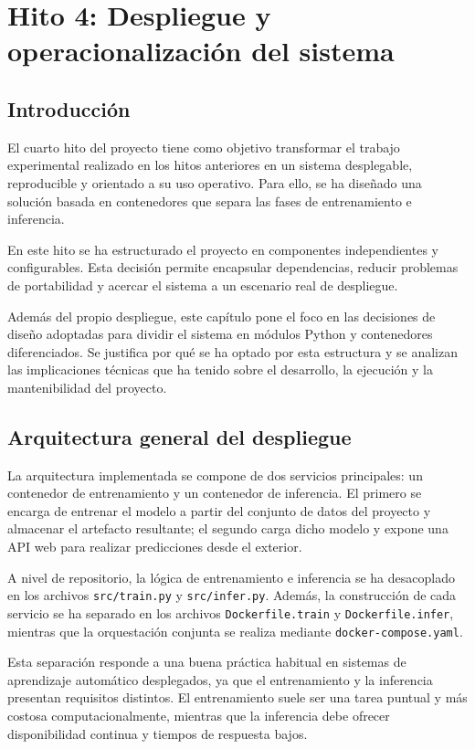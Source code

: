 \chapter{Hito 4: Despliegue y operacionalizaci\'on del sistema}
\label{chap:hito4}

\section{Introducci\'on}

El cuarto hito del proyecto tiene como objetivo transformar el trabajo experimental realizado en los hitos anteriores
en un sistema desplegable, reproducible y orientado a su uso operativo. Para ello, se ha dise\~nado una soluci\'on basada
en contenedores que separa las fases de entrenamiento e inferencia.

En este hito se ha estructurado el proyecto en componentes independientes y configurables. Esta decisi\'on permite encapsular 
dependencias, reducir problemas de portabilidad y acercar el sistema a un escenario real de despliegue.

Adem\'as del propio despliegue, este cap\'itulo pone el foco en las decisiones de dise\~no adoptadas para dividir el sistema
en m\'odulos Python y contenedores diferenciados. Se justifica por qu\'e se ha optado por esta estructura y se analizan las
implicaciones t\'ecnicas que ha tenido sobre el desarrollo, la ejecuci\'on y la mantenibilidad del proyecto.

\section{Arquitectura general del despliegue}

La arquitectura implementada se compone de dos servicios principales: un contenedor de entrenamiento y un contenedor de inferencia.
El primero se encarga de entrenar el modelo a partir del conjunto de datos del proyecto y almacenar el artefacto resultante; el segundo
carga dicho modelo y expone una API web para realizar predicciones desde el exterior.

A nivel de repositorio, la l\'ogica de entrenamiento e inferencia se ha desacoplado en los archivos \texttt{src/train.py} y \texttt{src/infer.py}.
Adem\'as, la construcci\'on de cada servicio se ha separado en los archivos \texttt{Dockerfile.train} y \texttt{Dockerfile.infer}, mientras que
la orquestaci\'on conjunta se realiza mediante \texttt{docker-compose.yaml}.

Esta separaci\'on responde a una buena pr\'actica habitual en sistemas de aprendizaje autom\'atico desplegados, ya que el entrenamiento y
la inferencia presentan requisitos distintos. El entrenamiento suele ser una tarea puntual y m\'as costosa computacionalmente, mientras
que la inferencia debe ofrecer disponibilidad continua y tiempos de respuesta bajos.

